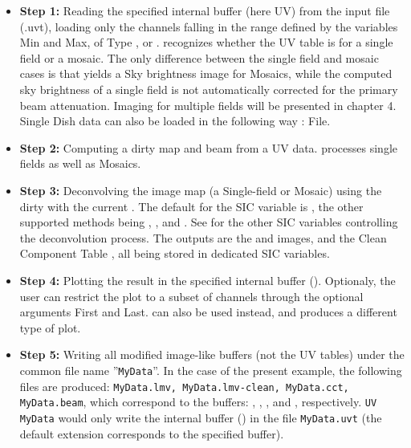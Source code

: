 \begin{itemize}
\item \textbf{Step 1:} Reading  the  specified  internal  buffer (here 
UV) from the input file (.uvt), loading only the channels falling in 
the range defined by the variables Min and Max, of Type , 
 or . \imager{} recognizes whether the UV 
table is for a single field or a mosaic. The only difference between 
the single field and mosaic cases is that \imager{} yields a Sky 
brightness image for Mosaics, while the computed sky brightness of a 
single field is not automatically corrected for the primary beam 
attenuation. Imaging for multiple fields will be presented in chapter 
4. Single Dish data can also be loaded  in the following way : 
 File.
\item \textbf{Step 2:} Computing a  dirty  map  and  beam from a UV data. 
 processes  single fields as well as Mosaics.
\item \textbf{Step 3:} Deconvolving the  image map (a Single-field or Mosaic) 
using the dirty  with the current . The default 
for the SIC variable  is ,  the other 
supported methods being , ,  and 
. See  for the other SIC variables 
controlling the deconvolution process. The outputs are the  and 
 images, and the Clean Component Table , all being stored 
in dedicated SIC variables.
\item \textbf{Step 4:} Plotting the result in the specified internal 
buffer (). Optionaly, the user can restrict the plot to a 
subset of channels through the optional arguments First and Last. 
 can also be used instead, and produces a different 
type of plot.
\item \textbf{Step 5:}  Writing all modified image-like buffers (not 
the UV  tables) under the common file name ''\texttt{MyData}''. In the case of the 
present example, the following files are produced: \texttt{MyData.lmv, 
MyData.lmv-clean, MyData.cct, MyData.beam}, which correspond to the 
buffers: , , , and , respectively. 
\texttt{UV MyData} would only write the internal buffer () in the 
file \texttt{MyData.uvt} (the default extension corresponds to the specified 
buffer).
\end{itemize}    

